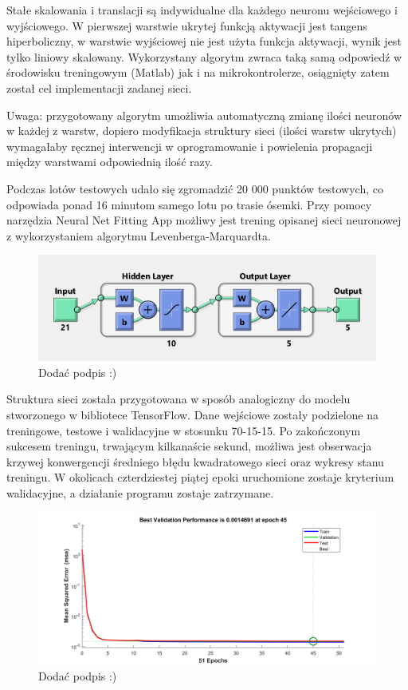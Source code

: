 \documentclass[12pt, a4paper]{article}
\begin{document}
Stałe skalowania i translacji są indywidualne dla każdego neuronu wejściowego i wyjściowego. W pierwszej warstwie ukrytej funkcją aktywacji jest tangens hiperboliczny, w warstwie wyjściowej nie jest użyta funkcja aktywacji, wynik jest tylko liniowy skalowany. Wykorzystany algorytm zwraca taką samą odpowiedź w środowisku treningowym (Matlab) jak i na mikrokontrolerze, osiągnięty zatem został cel implementacji zadanej sieci.

Uwaga: przygotowany algorytm umożliwia automatyczną zmianę ilości neuronów w każdej z warstw, dopiero modyfikacja struktury sieci (ilości warstw ukrytych) wymagałaby ręcznej interwencji w oprogramowanie i powielenia propagacji między warstwami odpowiednią ilość razy.

Podczas lotów testowych udało się zgromadzić 20 000 punktów testowych, co odpowiada ponad 16 minutom samego lotu po trasie ósemki. Przy pomocy narzędzia Neural Net Fitting App możliwy jest trening opisanej sieci neuronowej z wykorzystaniem algorytmu Levenberga-Marquardta. 

 \begin{figure}[ht]
    \centering
    \includegraphics[width=1\textwidth]{siecmatlab}
    \caption{Dodać podpis :)}
\end{figure}

Struktura sieci została przygotowana w sposób analogiczny do modelu stworzonego w bibliotece TensorFlow. Dane wejściowe zostały podzielone na treningowe, testowe i walidacyjne w stosunku 70-15-15. Po zakończonym sukcesem treningu, trwającym kilkanaście sekund, możliwa jest obserwacja krzywej konwergencji średniego błędu kwadratowego sieci oraz wykresy stanu treningu. W okolicach czterdziestej piątej epoki uruchomione zostaje kryterium walidacyjne, a działanie programu zostaje zatrzymane.


 \begin{figure}[ht]
    \centering
    \includegraphics[width=1\textwidth]{performance}
    \caption{Dodać podpis :)}
\end{figure}
\end{document}
